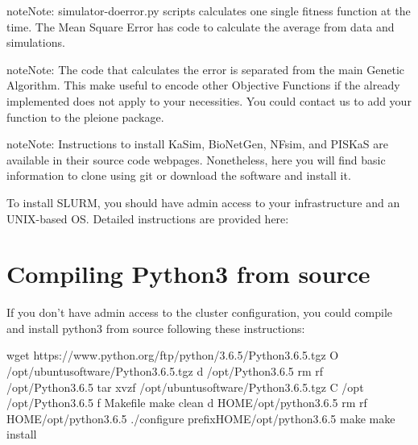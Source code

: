 \documentclass[letterpaper,10pt,english]{sphinxmanual}
\begin{document}
\begin{sphinxadmonition}{note}{Note:}
simulator-doerror.py scripts calculates one single fitness function at the time.
The Mean Square Error has code to calculate the average from data and simulations.
\end{sphinxadmonition}

\begin{sphinxadmonition}{note}{Note:}
The code that calculates the error is separated from the main Genetic
Algorithm. This make useful to encode other Objective Functions if the
already implemented does not apply to your necessities. You could contact us
to add your function to the pleione package.
\end{sphinxadmonition}

\begin{sphinxadmonition}{note}{Note:}
Instructions to install KaSim, BioNetGen, NFsim, and PISKaS are
available in their source code webpages. Nonetheless, here you will find
basic information to clone using git or download the software and install
it.

To install SLURM, you should have admin access to your infrastructure and an
UNIX-based OS. Detailed instructions are provided here:
{\hyperref[\detokenize{SLURM:slurm-instructions}]{}}
\end{sphinxadmonition}


\chapter{Compiling Python3 from source}
\label{\detokenize{Python3:compiling-python3-from-source}}\label{\detokenize{Python3::doc}}
If you don’t have admin access to the cluster configuration, you could compile
and install python3 from source following these instructions:

\begin{sphinxVerbatim}[commandchars=\\\{\}]
wget https://www.python.org/ftp/python/3.6.5/Python\PYGZhy{}3.6.5.tgz 
\PYGZhy{}O \PYGZti{}/opt/ubuntu\PYGZhy{}software/Python\PYGZhy{}3.6.5.tgz
 \PYG{o}{[} \PYGZhy{}d \PYGZti{}/opt/Python\PYGZhy{}3.6.5 \PYG{o}{]}  rm \PYGZhy{}rf \PYGZti{}/opt/Python\PYGZhy{}3.6.5 
tar xvzf \PYGZti{}/opt/ubuntu\PYGZhy{}software/Python\PYGZhy{}3.6.5.tgz \PYGZhy{}C \PYGZti{}/opt
 \PYGZti{}/opt/Python\PYGZhy{}3.6.5
 \PYG{o}{[} \PYGZhy{}f Makefile \PYG{o}{]}  make clean 
 \PYG{o}{[} \PYGZhy{}d HOME/opt/python\PYGZhy{}3.6.5 \PYG{o}{]}  rm \PYGZhy{}rf HOME/opt/python\PYGZhy{}3.6.5 
./configure \PYGZhy{}\PYGZhy{}prefixHOME/opt/python\PYGZhy{}3.6.5
make
make install
\end{sphinxVerbatim}
\end{document}
